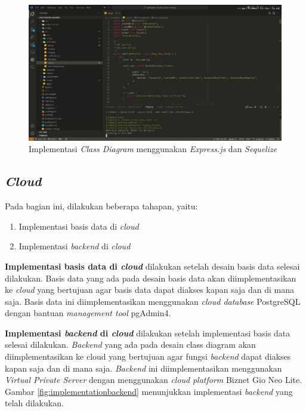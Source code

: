 \begin{figure}[htbp]
  \centering

  \includegraphics[scale=0.45]{gambar/bab3-implementasi-class-diagram.jpeg}

  \caption{Implementasi \emph{Class Diagram} menggunakan \emph{Express.js} dan \emph{Sequelize}}
  \label{fig:implementationclassdiagram}
\end{figure}

\subsection{\emph{Cloud}}

Pada bagian ini, dilakukan beberapa tahapan, yaitu:
\begin{enumerate}[nolistsep]
  \item Implementasi basis data di \emph{cloud}
  \item Implementasi \emph{backend} di \emph{cloud}
\end{enumerate}

\textbf{Implementasi basis data di \emph{cloud}} dilakukan setelah desain basis data selesai dilakukan. Basis data yang ada pada desain basis data akan diimplementasikan ke \emph{cloud} yang bertujuan agar basis data dapat diakses kapan saja dan di mana saja. Basis data ini diimplementasikan menggunakan \emph{cloud database} PostgreSQL dengan bantuan \emph{management tool} pgAdmin4.

\textbf{Implementasi \emph{backend} di \emph{cloud}} dilakukan setelah implementasi basis data selesai dilakukan. \emph{Backend} yang ada pada desain class diagram akan diimplementasikan ke cloud yang bertujuan agar fungsi \emph{backend} dapat diakses kapan saja dan di mana saja. \emph{Backend} ini diimplementasikan menggunakan \emph{Virtual Private Server} dengan menggunakan \emph{cloud} \emph{platform} Biznet Gio Neo Lite. Gambar \ref{fig:implementationbackend} menunjukkan implementasi \emph{backend} yang telah dilakukan.


